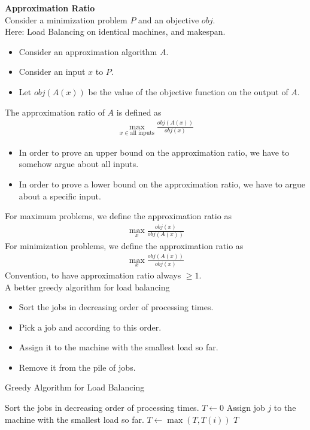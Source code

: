 \documentclass[onecolumn]{report}
\begin{document}
\textbf{Approximation Ratio}\\
Consider a minimization problem $P$ and an objective $obj$.\\
\indent Here: Load Balancing on identical machines, and makespan.
\begin{itemize}
    \item Consider an approximation algorithm $A$.
    \item Consider an input $x$ to $P$.
    \item Let $obj(A(x))$ be the value of the objective function on the output of $A$.
\end{itemize}
The approximation ratio of $A$ is defined as
\begin{align*}
    \max_{x \in \text{all inputs}} \frac{obj(A(x))}{obj(x)}
\end{align*}
\begin{itemize}
    \item In order to prove an upper bound on the approximation ratio, we have to somehow argue about all inputs.
    \item In order to prove a lower bound on the approximation ratio, we have to argue about a specific input.
\end{itemize}
For maximum problems, we define the approximation ratio as
\begin{align*}
    \max_x \frac{obj(x)}{obj(A(x))}
\end{align*}
For minimization problems, we define the approximation ratio as
\begin{align*}
    \max_x \frac{obj(A(x))}{obj(x)}
\end{align*}
Convention, to have approximation ratio always $\geq 1$.\\
A better greedy algorithm for load balancing\\
\begin{itemize}
    \item Sort the jobs in decreasing order of processing times.
    \item Pick a job and according to this order.
    \item Assign it to the machine with the smallest load so far.
    \item Remove it from the pile of jobs.
\end{itemize}
\begin{algorithm}[H]
\caption{Greedy Algorithm for Load Balancing}
\begin{algorithmic}[1]
\State Sort the jobs in decreasing order of processing times.
\State $T \gets 0$
\State Assign job $j$ to the machine with the smallest load so far.
\State $T \gets \max(T,T(i))$
\EndFor
\State \Return $T$
\end{algorithmic}
\end{algorithm}
\end{document}
